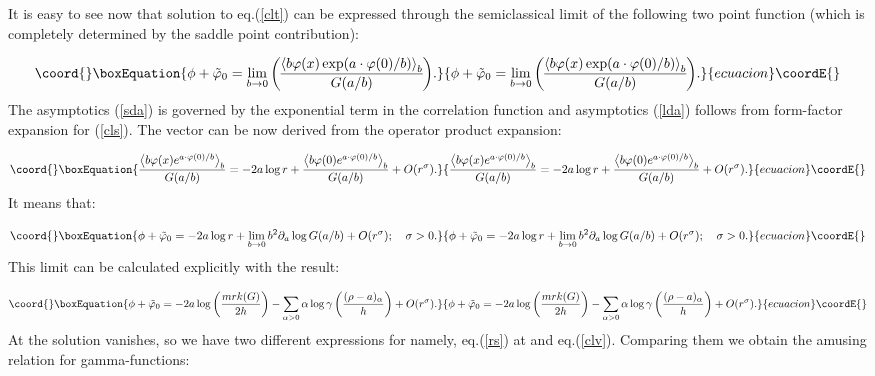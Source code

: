 \documentclass[a4paper,12pt]{article}
\begin{document}
It is easy to see now that solution \myHighlight{$\phi $}\coordHE{} to eq.(\ref{clt}) 
can be expressed through the
semiclassical limit of the following two point function (which is completely 
determined by the saddle point contribution):

\begin{equation}\coord{}\boxEquation{
\phi +\tilde{\varphi}_0=\lim_{b\rightarrow 0} 
{\left\langle b\varphi (x)\exp (a\cdot \varphi (0)/b)\right\rangle _b \overwithdelims() G(a/b)}.
\label{cls}
}{
\phi +\tilde{\varphi}_0=\lim_{b\rightarrow 0} 
{\left\langle b\varphi (x)\exp (a\cdot \varphi (0)/b)\right\rangle _b \overwithdelims() G(a/b)}.
}{ecuacion}\coordE{}\end{equation}
The asymptotics (\ref{sda}) is governed by the exponential term in the
correlation function and asymptotics (\ref{lda}) follows from form-factor
expansion for (\ref{cls}). The vector \coordHE{} can be now derived from the
operator product expansion:

\begin{equation}\coord{}\boxEquation{
\frac{\left\langle b\varphi (x)e^{a\cdot \varphi (0)/b}\right\rangle _b}
{G(a/b)}=-2a\log r+\frac{\left\langle b\varphi (0)e^{a\cdot \varphi
(0)/b}\right\rangle _b}{G(a/b)}+O(r^\sigma ).  \label{ope}
}{
\frac{\left\langle b\varphi (x)e^{a\cdot \varphi (0)/b}\right\rangle _b}
{G(a/b)}=-2a\log r+\frac{\left\langle b\varphi (0)e^{a\cdot \varphi
(0)/b}\right\rangle _b}{G(a/b)}+O(r^\sigma ).  }{ecuacion}\coordE{}\end{equation}
It means that:

\begin{equation}\coord{}\boxEquation{
\phi +\tilde{\varphi}_0=-2a\log r+\lim_{b\rightarrow 0}b^2\partial _a\log
G(a/b)+O(r^\sigma );\quad \sigma >0.  \label{bb}
}{
\phi +\tilde{\varphi}_0=-2a\log r+\lim_{b\rightarrow 0}b^2\partial _a\log
G(a/b)+O(r^\sigma );\quad \sigma >0.  }{ecuacion}\coordE{}\end{equation}
This limit can be calculated explicitly with the result:

\begin{equation}\coord{}\boxEquation{
\phi +\tilde{\varphi}_0=-2a\log \left( \frac{mrk(G)}{2h}\right)
-\sum_{\alpha >0}\alpha \log \gamma \left( \frac{(\rho -a)_\alpha }h\right)
+O(r^\sigma ).  \label{rs}
}{
\phi +\tilde{\varphi}_0=-2a\log \left( \frac{mrk(G)}{2h}\right)
-\sum_{\alpha >0}\alpha \log \gamma \left( \frac{(\rho -a)_\alpha }h\right)
+O(r^\sigma ).  }{ecuacion}\coordE{}\end{equation}
At \coordHE{} the solution \myHighlight{$\phi $}\coordHE{} vanishes, so we have two different expressions
for \coordHE{} namely, eq.(\ref{rs}) at \coordHE{} and eq.(\ref{clv}).
Comparing them we obtain the amusing relation for gamma-functions:
\end{document}
